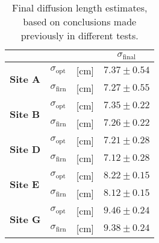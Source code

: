 \documentclass[../../CompleteThesis2/Complete_2ndDraft]{subfiles}
\begin{document}
\begin{table}[ht]
	\centering
	\begin{tabular}{l l l | c }
		& & & $\sigma_{\text{final}}$\\[0.15cm]
		\hline
		\hline 
		\multirow{2}{*}{\textbf{Site A}} & $\sigma_{\text{opt}}$ & [cm] & $7.37 \pm 0.54$ \\[0.1cm]
		& $\sigma_{\text{firn}}$ & [cm] & $7.27\pm 0.55$ \\[0.1cm]
		\hline
		
		\multirow{2}{*}{\textbf{Site B}} & $\sigma_{\text{opt}}$ & [cm] & $7.35 \pm 0.22$ \\[0.1cm]
		& $\sigma_{\text{firn}}$ & [cm] & $7.26\pm 0.22$\\[0.1cm]
		\hline
		
		\multirow{2}{*}{\textbf{Site D}} & $\sigma_{\text{opt}}$ & [cm] & $7.21 \pm 0.28$ \\[0.1cm]
		& $\sigma_{\text{firn}}$ & [cm] & $7.12 \pm 0.28$\\[0.1cm]
		\hline
		
		\multirow{2}{*}{\textbf{Site E}} & $\sigma_{\text{opt}}$ & [cm] & $ 8.22\pm 0.15$ \\[0.1cm]
		& $\sigma_{\text{firn}}$ & [cm] & $8.12 \pm 0.15$\\[0.1cm]
		\hline
		
		\multirow{2}{*}{\textbf{Site G}} & $\sigma_{\text{opt}}$ & [cm] & $9.46 \pm 0.24$ \\[0.1cm]
		& $\sigma_{\text{firn}}$ & [cm] & $9.38 \pm 0.24$\\[0.1cm]
		
		\hline
	\end{tabular}
\caption[Final $\sigma$ Estimates]{\small Final diffusion length estimates, based on conclusions made previously in different tests.}
\label{Tab:SigmaEstFinal}
\end{table}
\end{document}

